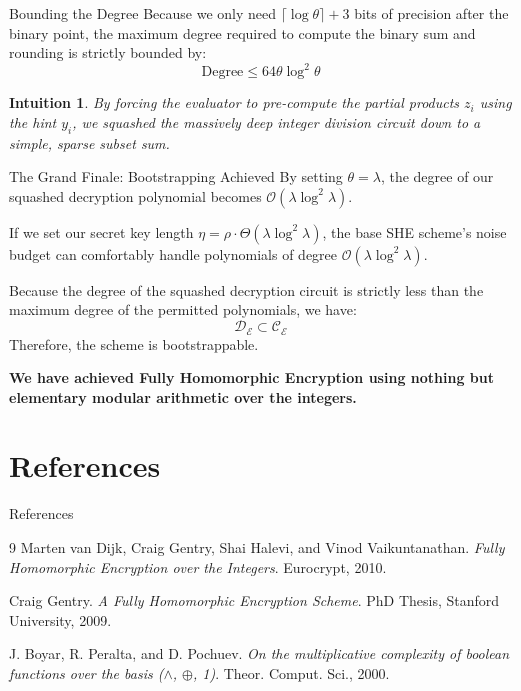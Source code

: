 \documentclass[10pt, aspectratio=169]{beamer}
\newtheorem{intuition}{Intuition}
\begin{document}
\begin{frame}{Bounding the Degree}
    Because we only need $\lceil \log \theta \rceil + 3$ bits of precision after the binary point, the maximum degree required to compute the binary sum and rounding is strictly bounded by:
    $$\text{Degree} \le 64\theta \log^2\theta$$
    \pause
    
    \vspace{0.3cm}
    \begin{intuition}
    By forcing the evaluator to pre-compute the partial products $z_i$ using the hint $y_i$, we squashed the massively deep integer division circuit down to a simple, sparse subset sum. 
    \end{intuition}
\end{frame}

\begin{frame}{The Grand Finale: Bootstrapping Achieved}
    By setting $\theta = \lambda$, the degree of our squashed decryption polynomial becomes $\mathcal{O}(\lambda \log^2 \lambda)$.
    \pause
    
    \vspace{0.3cm}
    \begin{theorem}
    If we set our secret key length $\eta = \rho \cdot \Theta(\lambda \log^2 \lambda)$, the base SHE scheme's noise budget can comfortably handle polynomials of degree $\mathcal{O}(\lambda \log^2 \lambda)$. 
    \pause
    
    Because the degree of the squashed decryption circuit is strictly less than the maximum degree of the permitted polynomials, we have:
    $$\mathcal{D}_{\mathcal{E}} \subset \mathcal{C}_{\mathcal{E}}$$
    Therefore, the scheme is bootstrappable.
    \end{theorem}
    \pause
    
    \vspace{0.3cm}
    \begin{center}
        \textbf{We have achieved Fully Homomorphic Encryption using nothing but elementary modular arithmetic over the integers.}
    \end{center}
\end{frame}

\section{References}
\begin{frame}{References}
    \begin{thebibliography}{9}
        Marten van Dijk, Craig Gentry, Shai Halevi, and Vinod Vaikuntanathan.
        \textit{Fully Homomorphic Encryption over the Integers}. 
        Eurocrypt, 2010.
        
        Craig Gentry.
        \textit{A Fully Homomorphic Encryption Scheme}. 
        PhD Thesis, Stanford University, 2009.
        
        J. Boyar, R. Peralta, and D. Pochuev.
        \textit{On the multiplicative complexity of boolean functions over the basis ($\land$, $\oplus$, 1)}.
        Theor. Comput. Sci., 2000.
    \end{thebibliography}
\end{frame}
\end{document}
